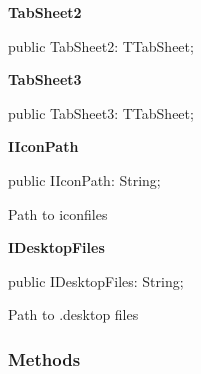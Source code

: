 \documentclass{report}
\newif\ifpdf
\begin{document}
\begin{list}{}
\begin{flushleft}
\ifpdf
\end{flushleft}
\fi


\par  \label{dgunit.TDGForm-TabSheet2}
\item[\textbf{TabSheet2}\hfill]
\ifpdf
\begin{flushleft}
\fi
\begin{ttfamily}
public TabSheet2: TTabSheet;\end{ttfamily}

\ifpdf
\end{flushleft}
\fi


\par  \label{dgunit.TDGForm-TabSheet3}
\item[\textbf{TabSheet3}\hfill]
\ifpdf
\begin{flushleft}
\fi
\begin{ttfamily}
public TabSheet3: TTabSheet;\end{ttfamily}

\ifpdf
\end{flushleft}
\fi


\par  \label{dgunit.TDGForm-IIconPath}
\item[\textbf{IIconPath}\hfill]
\ifpdf
\begin{flushleft}
\fi
\begin{ttfamily}
public IIconPath: String;\end{ttfamily}

\ifpdf
\end{flushleft}
\fi


\par Path to iconfiles\label{dgunit.TDGForm-IDesktopFiles}
\item[\textbf{IDesktopFiles}\hfill]
\ifpdf
\begin{flushleft}
\fi
\begin{ttfamily}
public IDesktopFiles: String;\end{ttfamily}

\ifpdf
\end{flushleft}
\fi


\par Path to .desktop files\end{list}
\subsubsection*{\large{\textbf{Methods}}\normalsize\hspace{1ex}\hfill}
\end{document}
